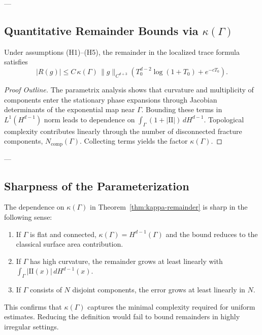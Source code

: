 ---

\subsection{Quantitative Remainder Bounds via $\kappa(\Gamma)$}

\begin{theorem}
\label{thm:kappa-remainder}
Under assumptions (H1)--(H5), the remainder in the localized trace formula satisfies
\[
|R(g)| \leq C \, \kappa(\Gamma) \, \|g\|_{C^{d+3}} 
\left( T_0^{d-2} \log(1+T_0) + e^{-cT_0} \right).
\]
\end{theorem}

\begin{proof}[Proof Outline]
The parametrix analysis shows that curvature and multiplicity of components 
enter the stationary phase expansions through Jacobian determinants 
of the exponential map near $\Gamma$.  
Bounding these terms in $L^1(H^{d-1})$ norm leads to dependence on $\int_\Gamma (1+|\mathrm{II}|) \, dH^{d-1}$.
Topological complexity contributes linearly through the number of 
disconnected fracture components, $N_{\mathrm{comp}}(\Gamma)$.  
Collecting terms yields the factor $\kappa(\Gamma)$.
\end{proof}

---

\subsection{Sharpness of the Parameterization}

\begin{proposition}
The dependence on $\kappa(\Gamma)$ in Theorem~\ref{thm:kappa-remainder} 
is sharp in the following sense:
\begin{enumerate}
  \item If $\Gamma$ is flat and connected, $\kappa(\Gamma) = H^{d-1}(\Gamma)$ 
  and the bound reduces to the classical surface area contribution.
  \item If $\Gamma$ has high curvature, the remainder grows at least linearly 
  with $\int_\Gamma |\mathrm{II}(x)| \, dH^{d-1}(x)$.
  \item If $\Gamma$ consists of $N$ disjoint components, 
  the error grows at least linearly in $N$.
\end{enumerate}
\end{proposition}

\begin{remark}
This confirms that $\kappa(\Gamma)$ captures the minimal complexity 
required for uniform estimates.  
Reducing the definition would fail to bound remainders in highly irregular settings.
\end{remark}


